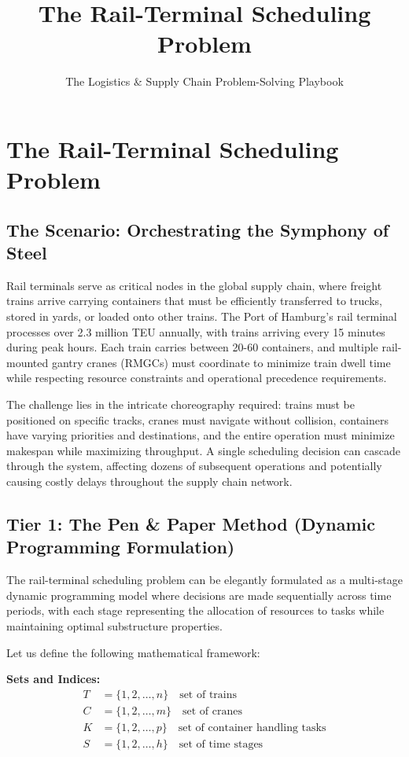 \documentclass{article}
\title{The Rail-Terminal Scheduling Problem}
\author{The Logistics \& Supply Chain Problem-Solving Playbook}
\date{}
\begin{document}
\maketitle

\section{The Rail-Terminal Scheduling Problem}

\subsection{The Scenario: Orchestrating the Symphony of Steel}

Rail terminals serve as critical nodes in the global supply chain, where freight trains arrive carrying containers that must be efficiently transferred to trucks, stored in yards, or loaded onto other trains. The Port of Hamburg's rail terminal processes over 2.3 million TEU annually, with trains arriving every 15 minutes during peak hours. Each train carries between 20-60 containers, and multiple rail-mounted gantry cranes (RMGCs) must coordinate to minimize train dwell time while respecting resource constraints and operational precedence requirements.

The challenge lies in the intricate choreography required: trains must be positioned on specific tracks, cranes must navigate without collision, containers have varying priorities and destinations, and the entire operation must minimize makespan while maximizing throughput. A single scheduling decision can cascade through the system, affecting dozens of subsequent operations and potentially causing costly delays throughout the supply chain network.

\subsection{Tier 1: The Pen \& Paper Method (Dynamic Programming Formulation)}

The rail-terminal scheduling problem can be elegantly formulated as a multi-stage dynamic programming model where decisions are made sequentially across time periods, with each stage representing the allocation of resources to tasks while maintaining optimal substructure properties.

Let us define the following mathematical framework:

\textbf{Sets and Indices:}
\begin{align}
T &= \{1, 2, \ldots, n\} \quad \text{set of trains} \\
C &= \{1, 2, \ldots, m\} \quad \text{set of cranes} \\
K &= \{1, 2, \ldots, p\} \quad \text{set of container handling tasks} \\
S &= \{1, 2, \ldots, h\} \quad \text{set of time stages}
\end{align}
\end{document}
